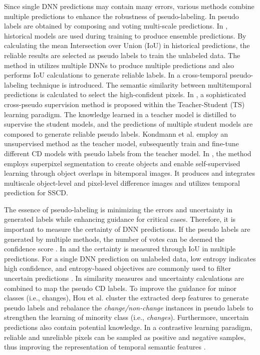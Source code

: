 Since single DNN predictions may contain many errors, various methods combine multiple predictions to enhance the robustness of pseudo-labeling. In \cite{shi2023multilayer} pseudo labels are obtained by composing and voting multi-scale predictions. In \cite{wang2022reliable}, historical models are used during training to produce ensemble predictions. By calculating the mean Intersection over Union (IoU) in historical predictions, the reliable results are selected as pseudo labels to train the unlabeled data. The method in \cite{yuan2024dynamically} utilizes multiple DNNs to produce multiple predictions and also performs IoU calculations to generate reliable labels. In \cite{ding2024scannet} a cross-temporal pseudo-labeling technique is introduced. The semantic similarity between multitemporal predictions is calculated to select the high-confident pixels. In \cite{yang2024ecps}, a sophisticated cross-pseudo supervision method is proposed within the Teacher-Student (TS) learning paradigm. The knowledge learned in a teacher model is distilled to supervise the student models, and the predictions of multiple student models are composed to generate reliable pseudo labels. Kondmann et al. \cite{kondmann2023semisiroc} employ an unsupervised method as the teacher model, subsequently train and fine-tune different CD models with pseudo labels from the teacher model. In \cite{zhan2023s}, the method employs superpixel segmentation to create objects and enable self-supervised learning through object overlaps in bitemporal images. It produces and integrates multiscale object-level and pixel-level difference images and utilizes temporal prediction for SSCD.

The essence of pseudo-labeling is minimizing the errors and uncertainty in generated labels while enhancing guidance for critical cases. Therefore, it is important to measure the certainty of DNN predictions. If the pseudo labels are generated by multiple methods, the number of votes can be deemed the confidence score \cite{kondmann2023semisiroc}. In \cite{yuan2024dynamically} and \cite{wang2022reliable} the certainty is measured through IoU in multiple predictions. For a single DNN prediction on unlabeled data, low entropy indicates high confidence, and entropy-based objectives are commonly used to filter uncertain predictions \cite{wang2022semisupervised} \cite{sun2023semibuildingchange}. In \cite{zhang2019land} similarity measures and uncertainty calculations are combined to map the pseudo CD labels. To improve the guidance for minor classes (i.e., changes), Hou et al. \cite{hou2023deep} cluster the extracted deep features to generate pseudo labels and rebalance the \textit{change/non-change} instances in pseudo labels to strengthen the learning of minority class (i.e., \textit{changes}). Furthermore, uncertain predictions also contain potential knowledge. In a contrastive learning paradigm, reliable and unreliable pixels can be sampled as positive and negative samples, thus improving the representation of temporal semantic features \cite{wang2022semisupervised, zhang2024remote}.

